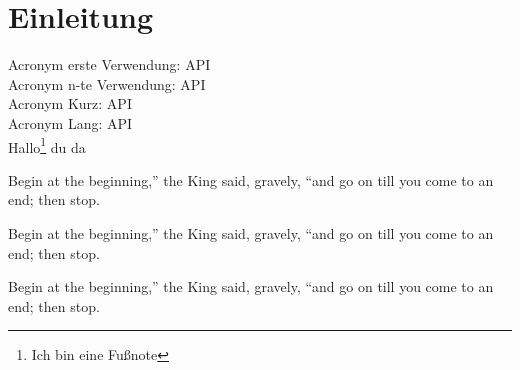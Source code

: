 \chapter{Einleitung}
\label{ch:einleitung}

Acronym erste Verwendung: \ac{API} \\
Acronym n-te Verwendung: \ac{API} \\
Acronym Kurz: \acs{API} \\
Acronym Lang: \acl{API} \\
Hallo\footnote{Ich bin eine Fußnote} du da

\begin{fquote}
	Begin at the beginning,'' the King said, gravely, ``and go on till you come to an end; then stop.
\end{fquote}

\begin{fquote}
	Begin at the beginning,'' the King said, gravely, ``and go on till you come to an end; then stop.
\end{fquote}

\begin{fquote}
	Begin at the beginning,'' the King said, gravely, ``and go on till you come to an end; then stop.
\end{fquote}